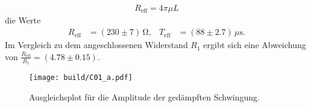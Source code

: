 \begin{align*}
    R_\text{eff} = 4 \pi \mu L
\end{align*}
die Werte 
\begin{align}
    R_\text{eff} &= (\num[]{230} \pm \num[]{7}) \, \unit{\ohm}, & 
    T_\text{eff} &= (\num[]{88} \pm \num[]{2.7}) \, \mu \unit{\second}.
\end{align}
Im Vergleich zu dem angeschlossenen Widerstand $R_1$ ergibt sich eine
Abweichung von $\frac{R_\text{eff}}{R_1} = (\num[]{4.78} \pm \num[]{0.15})$.
\begin{figure}[H]
    \centering
    \texttt{[image: build/C01\_a.pdf]}
    \caption{Ausgleichsplot für die Amplitude der gedämpften Schwingung.}
    \label{fig:plot1}
\end{figure}
